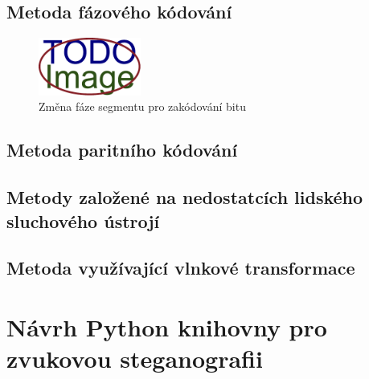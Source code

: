 \blindtext

\section{Metoda fázového kódování}
\label{sec:phase-coding}


\blindtext

\begin{figure}[hbt]
    \centering
    \includegraphics[width=0.3\textwidth]{obrazky/placeholder.pdf}
    \caption{Změna fáze segmentu pro zakódování bitu}
    \label{pic:phase-coding-phase-change}
\end{figure}

\blindtext

\section{Metoda paritního kódování}
\label{sec:parity-coding}


\blindtext

\blindtext

\blindtext

\section{Metody založené na nedostatcích lidského sluchového ústrojí}
\label{sec:has}


\blindtext

\blindtext

\blindtext

\section{Metoda využívající vlnkové transformace}
\label{sec:wavelet-transform}


\blindtext


\chapter{Návrh Python knihovny pro zvukovou steganografii}
\label{cha:library-design}

